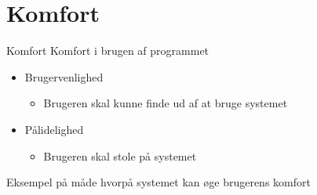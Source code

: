 \section{Komfort}
\begin{frame}{Komfort}{}
Komfort i brugen af programmet
\begin{itemize}
\item Brugervenlighed
\begin{itemize}
\item Brugeren skal kunne finde ud af at bruge systemet
\end{itemize}
\item Pålidelighed
\begin{itemize}
\item Brugeren skal stole på systemet
\end{itemize}
\end{itemize}
Eksempel på måde hvorpå systemet kan øge brugerens komfort
\end{frame}